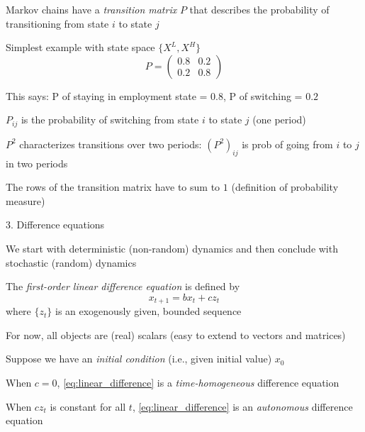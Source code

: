 \documentclass[11pt, aspectratio=169]{beamer}
\newenvironment{witemize}{\itemize\addtolength{\itemsep}{10pt}}{\enditemize}
\begin{document}
\begin{frame}{}
\begin{witemize}
\item Markov chains have a \textit{transition matrix} $P$ that describes the probability of transitioning from state $i$ to state $j$

\item Simplest example with state space $\{X^L, X^H\}$
\begin{equation*}
	P = \begin{pmatrix} 0.8 & 0.2 \\ 0.2 & 0.8 \end{pmatrix}
\end{equation*}

\item This says: P of staying in employment state = $0.8$, P of switching = $0.2$

\item $P_{ij}$ is the probability of switching from state $i$ to state $j$ (one period)

\item $P^2$ characterizes transitions over two periods: $(P^2)_{ij}$ is prob of going from $i$ to $j$ in two periods

\item The rows of the transition matrix have to sum to $1$ (definition of probability measure)
\end{witemize}
\end{frame}



\begin{frame}{3. Difference equations}
\begin{witemize}
\item We start with deterministic (non-random) dynamics and then conclude with stochastic (random) dynamics

\item The \textit{first-order linear difference equation} is defined by
\begin{equation}\label{eq:linear_difference}
	x_{t+1} = b x_t + c z_t 
\end{equation}
where $\{z_t\}$ is an exogenously given, bounded sequence

\item For now, all objects are (real) scalars (easy to extend to vectors and matrices)

\item Suppose we have an \textit{initial condition} (i.e., given initial value) $x_0$

\item When $c = 0$, \eqref{eq:linear_difference} is a \textit{time-homogeneous} difference equation

\item When $cz_t$ is constant for all $t$, \eqref{eq:linear_difference} is an \textit{autonomous} difference equation

\end{witemize}
\end{frame}
\end{document}
